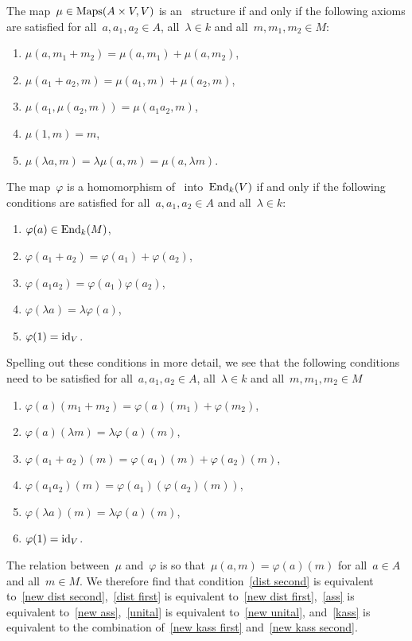 The map~$\mu \in \operatorname{Maps}(A \times V, V)$ is an~{} structure if and only if the following axioms are satisfied for all~$a, a_1, a_2 \in A$, all~$\lambda \in k$ and all~$m, m_1, m_2 \in M$:
\begin{enumerate}[label=(MS\arabic*)]
  \item
    \label{dist second}
    $\mu(a,m_1 + m_2) = \mu(a,m_1) + \mu(a,m_2)$,
  \item
    \label{dist first}
    $\mu(a_1 + a_2,m) = \mu(a_1,m) + \mu(a_2,m)$,
  \item
    \label{ass}
    $\mu(a_1, \mu(a_2, m)) = \mu(a_1 a_2, m)$,
  \item
    \label{unital}
    $\mu(1,m) = m$,
  \item
    \label{kass}
    $\mu(\lambda a, m) = \lambda \mu(a,m) = \mu(a,\lambda m)$.
\end{enumerate}
The map~$\varphi$ is a homomorphism of~{\kalg} into~$\operatorname{End}_k(V)$ if and only if the following conditions are satisfied for all~$a, a_1, a_2 \in A$ and all~$\lambda \in k$:
\begin{enumerate}[label=(AH\arabic*)]
  \item
    $\varphi(a) \in \operatorname{End}_k(M)$,
  \item
    $\varphi(a_1 + a_2) = \varphi(a_1) + \varphi(a_2)$,
  \item
    $\varphi(a_1 a_2) = \varphi(a_1) \varphi(a_2)$,
  \item
    $\varphi(\lambda a) = \lambda \varphi(a)$,
  \item
    $\varphi(1) = \operatorname{id}_V$.
\end{enumerate}
Spelling out these conditions in more detail, we see that the following conditions need to be satisfied for all~$a, a_1, a_2 \in A$, all~$\lambda \in k$ and all~$m, m_1, m_2 \in M$
\begin{enumerate}[label=(AH\arabic**)]
  \item
    \label{new dist second}
    $\varphi(a)(m_1 + m_2) = \varphi(a)(m_1) + \varphi(m_2)$,
  \item
    \label{new kass first}
    $\varphi(a)(\lambda m) = \lambda \varphi(a)(m)$,
  \item
    \label{new dist first}
    $\varphi(a_1 + a_2)(m) = \varphi(a_1)(m) + \varphi(a_2)(m)$,
  \item
    \label{new ass}
    $\varphi(a_1 a_2)(m) = \varphi(a_1)(\varphi(a_2)(m))$,
  \item
    \label{new kass second}
    $\varphi(\lambda a)(m) = \lambda \varphi(a)(m)$,
  \item
    \label{new unital}
    $\varphi(1) = \operatorname{id}_V$.
\end{enumerate}
The relation between~$\mu$ and~$\varphi$ is so that~$\mu(a,m) = \varphi(a)(m)$ for all~$a \in A$ and all~$m \in M$.
We therefore find that condition~\ref{dist second} is equivalent to~\ref{new dist second},~\ref{dist first} is equivalent to~\ref{new dist first},~\ref{ass} is equivalent to~\ref{new ass},~\ref{unital} is equivalent to~\ref{new unital}, and~\ref{kass} is equivalent to the combination of~\ref{new kass first} and~\ref{new kass second}.





